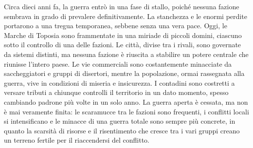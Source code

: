 \documentclass[10pt, a4paper]{report}
\begin{document}
\begin{multicols}{2}
Circa dieci anni fa, la guerra entrò in una fase di stallo, poiché nessuna fazione sembrava in grado di prevalere definitivamente. La stanchezza e le enormi perdite portarono a una tregua temporanea, sebbene senza una vera pace. Oggi, le Marche di Toposia sono frammentate in una miriade di piccoli domini, ciascuno sotto il controllo di una delle fazioni. Le città, divise tra i rivali, sono governate da sistemi distinti, ma nessuna fazione è riuscita a stabilire un potere centrale che riunisse l’intero paese. Le vie commerciali sono costantemente minacciate da saccheggiatori e gruppi di disertori, mentre la popolazione, ormai rassegnata alla guerra, vive in condizioni di miseria e insicurezza. I contadini sono costretti a versare tributi a chiunque controlli il territorio in un dato momento, spesso cambiando padrone più volte in un solo anno. 
La guerra aperta è cessata, ma non è mai veramente finita: le scaramucce tra le fazioni sono frequenti, i conflitti locali si intensificano e le minacce di una guerra totale sono sempre più concrete, in quanto la scarsità di risorse e il risentimento che cresce tra i vari gruppi creano un terreno fertile per il riaccendersi del conflitto.


\end{multicols}
\end{document}
